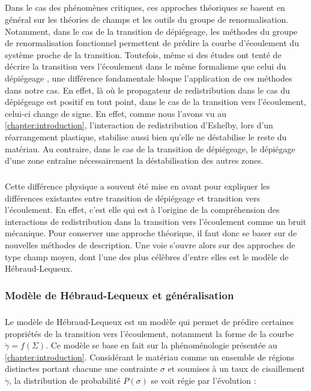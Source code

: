 \subparagraph{}Dans le cas des phénomènes critiques, ces approches théoriques se basent en général sur les théories de champs et les outils du groupe de renormalisation. Notamment, dans le cas de la transition de dépiégeage, les méthodes du groupe de renormalisation fonctionnel permettent de prédire la courbe d'écoulement du système proche de la transition. Toutefois, même si des études ont tenté de décrire la transition vers l'écoulement dans le même formalisme que celui du dépiégeage \cite{tyukodi_depinning_2016}, une différence fondamentale bloque l'application de ces méthodes dans notre cas. En effet, là où le propagateur de redistribution dans le cas du dépiégeage est positif en tout point, dans le cas de la transition vers l'écoulement, celui-ci change de signe. En effet, comme nous l'avons vu au \autoref{chapter:introduction}, l'interaction de redistribution d'Eshelby, lors d'un réarrangement plastique, stabilise aussi bien qu'elle ne déstabilise le reste du matériau. Au contraire, dans le cas de la transition de dépiégeage, le dépiégage d'une zone entraîne nécessairement la déstabilisation des autres zones.

\subparagraph{}Cette différence physique a souvent été mise en avant pour expliquer les différences existantes entre transition de dépiégeage et transition vers l'écoulement. En effet, c'est elle qui est à l'origine de la compréhension des interactions de redistribution dans la transition vers l'écoulement comme un bruit mécanique. Pour conserver une approche théorique, il faut donc se baser sur de nouvelles méthodes de description. Une voie s'ouvre alors sur des approches de type champ moyen, dont l'une des plus célèbres d'entre elles est le modèle de Hébraud-Lequeux.

\subsubsection{Modèle de Hébraud-Lequeux et généralisation}

\label{sec:HL_def}

\subparagraph{}Le modèle de Hébraud-Lequeux \cite{hebraud_mode_coupling_1998} est un modèle qui permet de prédire certaines propriétés de la transition vers l'écoulement, notamment la forme de la courbe $\dot{\gamma} = f(\Sigma)$. Ce modèle se base en fait sur la phénoménologie présentée au \autoref{chapter:introduction}. Considérant le matériau comme un ensemble de régions distinctes portant chacune une contrainte $\sigma$ et soumises à un taux de cisaillement $\dot{\gamma}$, la distribution de probabilité $P(\sigma)$ se voit régie par l'évolution :

